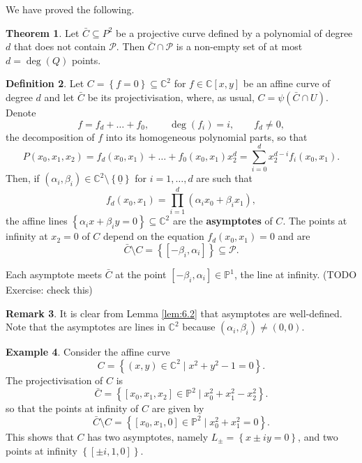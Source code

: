 \documentclass{article}
\newcommand{\C}{\mathbb{C}}
\renewcommand{\P}{\mathbb{P}}
\newcommand{\rb}[1]{\left( #1 \right)}
\renewcommand{\sb}[1]{\left[ #1 \right]}
\newcommand{\cb}[1]{\left\{ #1 \right\}}
\theoremstyle{definition}\newtheorem{definition}{Definition}[section]
\theoremstyle{definition}\newtheorem{notation}[definition]{Notation}
\theoremstyle{definition}\newtheorem{remark}[definition]{Remark}
\theoremstyle{definition}\newtheorem{example}[definition]{Example}
\theoremstyle{definition}\newtheorem{fact}{Fact}
\theoremstyle{definition}\newtheorem{exercise}{Exercise}
\newtheorem{theorem}[definition]{Theorem}
\begin{document}
We have proved the following.

\begin{theorem}
Let $ \bar{C} \subseteq P^2 $ be a projective curve defined by a polynomial of degree $ d $ that does not contain $ \mathcal{P} $. Then $ \bar{C} \cap \mathcal{P} $ is a non-empty set of at most $ d = \deg\rb{Q} $ points.
\end{theorem}

\begin{definition}
Let $ C = \cb{f = 0} \subseteq \C^2 $ for $ f \in \C\sb{x, y} $ be an affine curve of degree $ d $ and let $ \bar{C} $ be its projectivisation, where, as usual, $ C = \psi\rb{\bar{C} \cap U} $. Denote
$$ f = f_d + \dots + f_0, \qquad \deg\rb{f_i} = i, \qquad f_d \ne 0, $$
the decomposition of $ f $ into its homogeneous polynomial parts, so that
$$ P\rb{x_0, x_1, x_2} = f_d\rb{x_0, x_1} + \dots + f_0\rb{x_0, x_1}x_2^d = \sum_{i = 0}^d x_2^{d - i}f_i\rb{x_0, x_1}. $$
Then, if $ \rb{\alpha_i, \beta_i} \in \C^2 \setminus \cb{\underline{0}} $ for $ i = 1, \dots, d $ are such that
$$ f_d\rb{x_0, x_1} = \prod_{i = 1}^d \rb{\alpha_ix_0 + \beta_ix_1}, $$
the affine lines $ \cb{\alpha_ix + \beta_iy = 0} \subseteq \C^2 $ are the \textbf{asymptotes} of $ C $. The points at infinity at $ x_2 = 0 $ of $ C $ depend on the equation $ f_d\rb{x_0, x_1} = 0 $ and are
$$ \bar{C} \setminus C = \cb{\sb{-\beta_i, \alpha_i}} \subseteq \mathcal{P}. $$
\end{definition}

Each asymptote meets $ \bar{C} $ at the point $ \sb{-\beta_i, \alpha_i} \in \P^1 $, the line at infinity. (TODO Exercise: check this)

\begin{remark}
It is clear from Lemma \ref{lem:6.2} that asymptotes are well-defined. Note that the asymptotes are lines in $ \C^2 $ because $ \rb{\alpha_i, \beta_i} \ne \rb{0, 0} $.
\end{remark}

\begin{example}
Consider the affine curve
$$ C = \cb{\rb{x, y} \in \C^2 \mid x^2 + y^2 - 1 = 0}. $$
The projectivisation of $ C $ is
$$ \bar{C} = \cb{\sb{x_0, x_1, x_2} \in \P^2 \mid x_0^2 + x_1^2 - x_2^2}. $$
so that the points at infinity of $ C $ are given by
$$ \bar{C} \setminus C = \cb{\sb{x_0, x_1, 0} \in \P^2 \mid x_0^2 + x_1^2 = 0}. $$
This shows that $ C $ has two asymptotes, namely $ L_\pm = \cb{x \pm iy = 0} $, and two points at infinity $ \cb{\sb{\pm i, 1, 0}} $.
\end{example}
\end{document}
